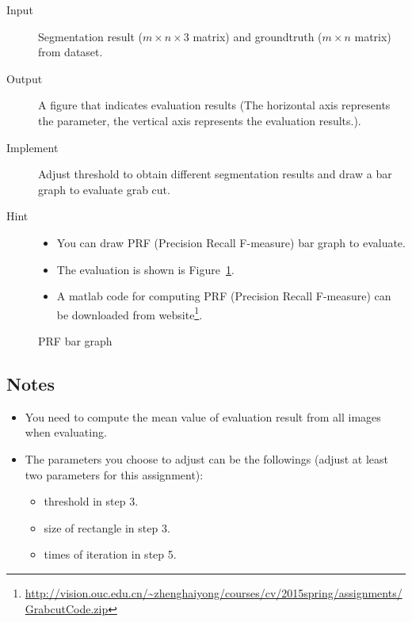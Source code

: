 \documentclass[12pt]{article}
\begin{document}
\begin{description}
\item[Input] Segmentation result ($m \times n \times 3$ matrix) and groundtruth ($m \times n$ matrix) from dataset.
\item[Output] A figure that indicates evaluation results (The horizontal axis represents the parameter, the vertical
axis represents the evaluation results.).
\item[Implement] Adjust {\color{blue} threshold} to obtain different segmentation results and draw a bar graph to evaluate grab cut.
\item[Hint] 
\begin{itemize}
\item You can draw PRF (Precision Recall F-measure) bar graph to evaluate.
\item The evaluation is shown is Figure~\ref{fig: evaluation}.
\item A matlab code for computing PRF (Precision Recall F-measure) can be downloaded from website\footnote{\url{http://vision.ouc.edu.cn/~zhenghaiyong/courses/cv/2015spring/assignments/GrabcutCode.zip}}.
\end{itemize}
\end{description}
\begin{figure}[!ht]
  \caption{PRF bar graph}
  \label{fig: evaluation} %
\end{figure}

\subsection{Notes\label{note}}

\begin{itemize}
\item You need to compute the mean value of evaluation result from all images when evaluating.
\item The parameters you choose to adjust can be the followings (adjust at least two parameters for this assignment):
	\begin{itemize}
        \item {\color{blue} threshold} in step 3.
 	\item {\color{blue} size of rectangle} in step 3. 
	\item {\color{blue} times of iteration} in step 5.
	\end{itemize}
\end{itemize}
\end{document}
